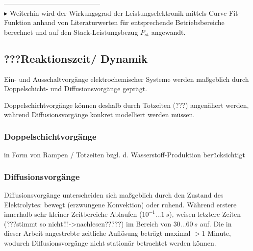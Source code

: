 \documentclass[onecolumn,10pt,titlepage]{article}
\begin{document}
%
------------------------------------------\\
$\blacktriangleright$ Weiterhin wird der Wirkungsgrad der Leistungselektronik mittels Curve-Fit-Funktion anhand von Literaturwerten für entsprechende Betriebsbereiche berechnet und auf den Stack-Leistungsbezug $P_{st}$ angewandt.

\subsection{???Reaktionszeit/ Dynamik}
Ein- und Ausschaltvorgänge elektrochemischer Systeme werden maßgeblich durch Doppelschicht- und Diffusionsvorgänge geprägt.

Doppelschichtvorgänge können deshalb durch Totzeiten (???) angenähert werden, während Diffusionsvorgänge konkret modelliert werden müssen.

\subsubsection{Doppelschichtvorgänge}
in Form von Rampen / Totzeiten bzgl. d. Wasserstoff-Produktion berücksichtigt

\subsubsection{Diffusionsvorgänge}
Diffusionsvorgänge unterscheiden sich maßgeblich durch den Zustand des Elektrolytes: bewegt (erzwungene Konvektion) oder ruhend. Während erstere innerhalb sehr kleiner Zeitbereiche Ablaufen ($10^{-1} \dots 1~s$), weisen letztere Zeiten (???stimmt so nicht!!!->nachlesen?????) im Bereich von $30 \dots 60~s$ auf. Die in dieser Arbeit angestrebte zeitliche Auflösung beträgt maximal $>1$ Minute, wodurch Diffusionsvorgänge nicht stationär betrachtet werden können.\\
\end{document}
